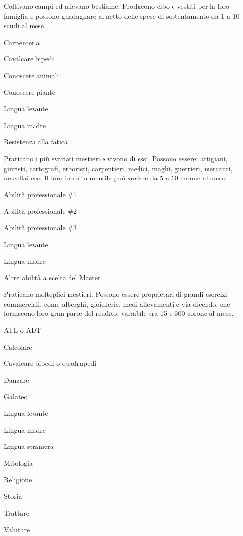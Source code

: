 
Coltivano campi ed allevano bestiame. Producono cibo e vestiti per la
loro famiglia e possono guadagnare al netto delle spese di
sostentamento da 1 a 10 scudi al mese.

\begin{abilist}
\item Carpenteria 
\item Cavalcare bipedi
\item Conoscere animali
\item Conoscere piante 
\item Lingua levante
\item Lingua madre
\item Resistenza alla fatica 
\end{abilist}


Praticano i pi\`u svariati mestieri e vivono di essi. Possono essere:
artigiani, giuristi, cartografi, erboristi, carpentieri, medici, maghi,
guerrieri, mercanti, macellai ecc. Il loro introito mensile pu\`o
variare da 5 a 30 corone al mese.

\begin{abilist}
\item Abilit\`a professionale \#1
\item Abilit\`a professionale \#2
\item Abilit\`a professionale \#3 
\item Lingua levante 
\item Lingua madre
\item Altre abilit\`a a scelta del Master 
\end{abilist}


Praticano molteplici mestieri. Possono essere proprietari di grandi
esercizi commerciali, come alberghi, gioiellerie, medi allevamenti e
via dicendo, che forniscono loro gran parte del reddito, variabile tra
15 e 300 corone al mese.

\begin{abilist}
\item ATL o ADT 
\item Calcolare 
\item Cavalcare bipedi o quadrupedi 
\item Danzare 
\item Galateo 
\item Lingua levante 
\item Lingua madre 
\item Lingua straniera 
\item Mitologia 
\item Religione 
\item Storia 
\item Trattare 
\item Valutare
\end{abilist}

